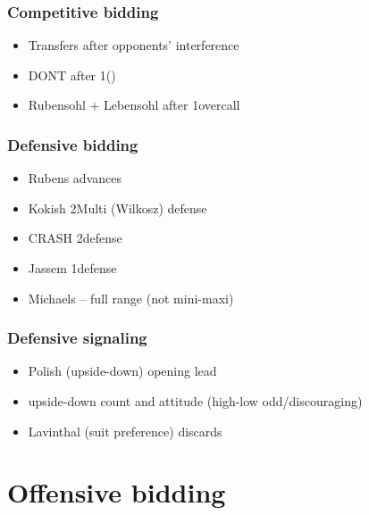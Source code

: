 \documentclass[12pt, a4paper]{report}
\begin{document}
{    \section*{\colorbox{blue!30}{Competitive bidding}}

        \begin{itemize}
            \item Transfers after opponents' interference
            \item DONT after 1\nt (\dbl)
            \item Rubensohl + Lebensohl after 1\nt overcall
        \end{itemize}

    \section*{\colorbox{blue!30}{Defensive bidding}}

        \begin{itemize}
            \item Rubens advances
            \item Kokish 2\diams Multi (Wilkosz) defense
            \item CRASH 2\nt defense
            \item Jassem 1\nt defense
            \item Michaels -- full range (not mini-maxi)
        \end{itemize}

    \section*{\colorbox{blue!30}{Defensive signaling}}

        \begin{itemize}
            \item Polish (upside-down) opening lead
            \item upside-down count and attitude (high-low odd/discouraging)
            \item Lavinthal (suit preference) discards
        \end{itemize}

}

\part*{\colorbox{RoyalPurple!30}{Offensive bidding}}
\end{document}
